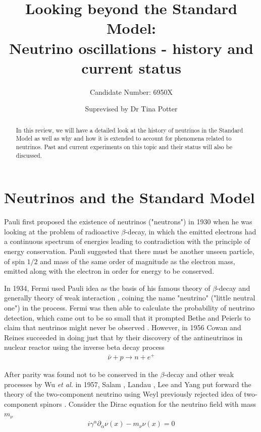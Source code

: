 \documentclass[english]{article}
\begin{document}
\title{Looking beyond the Standard Model: \\Neutrino oscillations - history and current status}
\author{Candidate Number: 6950X}
\date{Suprevised by Dr Tina Potter}
\maketitle

\thispagestyle{fancy}

\begin{abstract}
In this review, we will have a detailed look at the history of neutrinos in the Standard Model as well as why and how it is extended to account for phenomena related to neutrinos. Past and current experiments on this topic and their status will also be discussed.
\end{abstract}

\section{Neutrinos and the Standard Model}
	Pauli first proposed the existence of neutrinos ("neutrons") in 1930 \cite{pauliletter1930} when he was looking at the problem of radioactive $\beta$-decay, in which the emitted electrons had a continuous spectrum of energies leading to contradiction with the principle of energy conservation. Pauli suggested that there must be another unseen particle, of spin $1/2$ and mass of the same order of magnitude as the electron mass, emitted along with the electron in order for energy to be conserved.
    
    In 1934, Fermi used Pauli idea as the basis of his famous theory of $\beta$-decay and generally theory of weak interaction \cite{fermi1934}, coining the name "neutrino" ("little neutral one") in the process. Fermi was then able to calculate the probability of neutrino detection, which came out to be so small that it prompted Bethe and Peierls to claim that neutrinos might never be observed \cite{bethepeierls1934}. However, in 1956 Cowan and Reines succeeded in doing just that \cite{cowanreines1956} by their discovery of the antineutrinos in nuclear reactor using the inverse beta decay process
    \begin{gather}
    	\bar{\nu}+p \rightarrow n+e^{+}
    \end{gather}
    
    After parity was found not to be conserved in the $\beta$-decay and other weak processes \cite{wu1957} by Wu \textit{et al.} in 1957, Salam \cite{salam1956}, Landau \cite{landau1957}, Lee and Yang \cite{leeyang1957} put forward the theory of the two-component neutrino using Weyl previously rejected idea of two-component spinors \cite{weyl1929}. Consider the Dirac equation for the neutrino field with mass $m_{\nu}$
    \begin{gather}
    	i\gamma^{\alpha} \partial_{\alpha} \nu (x) - m_{\nu} \nu (x) = 0
    \end{gather}
    
\end{document}
